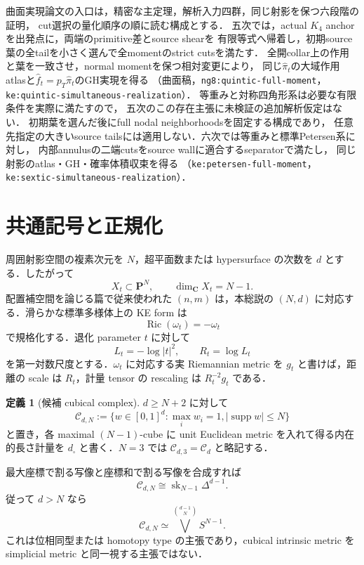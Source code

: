 \documentclass[a4paper,11pt]{ltjsarticle}
\numberwithin{equation}{section}
\theoremstyle{plain}
\theoremstyle{definition}
\newtheorem{definition}[theorem]{定義}
\theoremstyle{remark}
\newcommand{\PP}{\mathbf P}
\newcommand{\CC}{\mathbf C}
\newcommand{\cC}{\mathcal C}
\newcommand{\supp}{\operatorname{supp}}
\newcommand{\Ric}{\operatorname{Ric}}
\newcommand{\sk}{\operatorname{sk}}
\newcommand{\Lt}{L_t}
\newcommand{\Rt}{R_t}
\begin{document}
曲面実現論文の入口は，精密な主定理，解析入力四群，同じ射影を保つ六段階の証明，
cut選択の量化順序の順に読む構成とする．
五次では，actual $K_4$ anchorを出発点に，両端のprimitive差とsource shearを
有限等式へ帰着し，初期source葉の全tailを小さく選んで全momentのstrict cutsを満たす．
全開collar上の作用と葉を一致させ，normal momentを保つ相対変更により，
同じ$\widehat\pi_t$の大域作用atlasと$\widehat f_t=p_T\widehat\pi_t$のGH実現を得る
（曲面稿，\texttt{ng8:quintic-full-moment}，
\texttt{ke:quintic-simultaneous-realization}）．
等重みと対称四角形系は必要な有限条件を実際に満たすので，
五次のこの存在主張に未検証の追加解析仮定はない．
初期葉を選んだ後にfull nodal neighborhoodsを固定する構成であり，
任意先指定の大きいsource tailsには適用しない．六次では等重みと標準Petersen系に対し，
内部annulusの二端cutsをsource wallに適合するseparatorで満たし，
同じ射影のatlas・GH・確率体積収束を得る
（\texttt{ke:petersen-full-moment}，\texttt{ke:sextic-simultaneous-realization}）．

\section{共通記号と正規化}

周囲射影空間の複素次元を \(N\)，超平面数または hypersurface の次数を \(d\) とする．したがって
\[
 X_t\subset\PP^N,\qquad \dim_{\CC}X_t=N-1.
\]
配置補空間を論じる篇で従来使われた \((n,m)\) は，本総説の \((N,d)\) に対応する．滑らかな標準多様体上の KE form は
\[
 \Ric(\omega_t)=-\omega_t
\]
で規格化する．退化 parameter \(t\) に対して
\[
 \Lt=-\log|t|^2,\qquad \Rt=\log\Lt
\]
を第一対数尺度とする．\(\omega_t\) に対応する実 Riemannian metric を \(g_t\) と書けば，距離の scale は \(\Rt\)，計量 tensor の rescaling は \(\Rt^{-2}g_t\) である．

\begin{definition}[候補 cubical complex]
\label{def:candidate-complex}
\(d\ge N+2\) に対して
\begin{equation}
 \cC_{d,N}:=
 \{w\in[0,1]^d:\max_iw_i=1, |\supp w|\le N\}
\label{eq:CdN}
\end{equation}
と置き，各 maximal \((N-1)\)-cube に unit Euclidean metric を入れて得る内在的長さ計量を \(d_\square\) と書く．\(N=3\) では \(\cC_{d,3}=\cC_d\) と略記する．
\end{definition}

最大座標で割る写像と座標和で割る写像を合成すれば
\begin{equation}
 \cC_{d,N}\cong \sk_{N-1}\Delta^{d-1}.
\label{eq:skeleton-homeomorphism}
\end{equation}
従って \(d>N\) なら
\begin{equation}
 \cC_{d,N}\simeq
 \bigvee^{\binom{d-1}{N}}S^{N-1}.
\label{eq:wedge-type}
\end{equation}
これは位相同型または homotopy type の主張であり，cubical intrinsic metric を simplicial metric と同一視する主張ではない．
\end{document}

